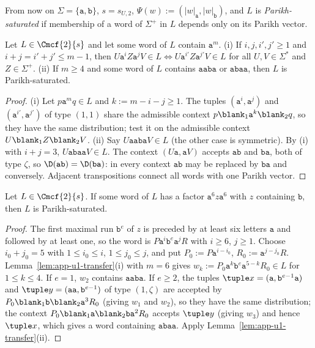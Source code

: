 From now on $\Sigma=\{\mathtt a,\mathtt b\}$, $s=s_{U,2}$, $\Psi(w):=(|w|_{\mathtt a},|w|_{\mathtt b})$,
and $L$ is \emph{Parikh-saturated} if membership of a word of $\Sigma^+$ in $L$
depends only on its Parikh vector.

\begin{lemma}\label{lem:app-u1-transfer}
Let $L\in\Cmcf{2}{s}$ and let some word of $L$ contain $\mathtt a^m$.
\textup{(i)} If $i,j,i',j'\ge1$ and $i+j=i'+j'\le m-1$, then
$U\mathtt a^iZ\mathtt a^jV\in L\iff U\mathtt a^{i'}Z\mathtt a^{j'}V\in L$ for all
$U,V\in\Sigma^*$ and $Z\in\Sigma^+$.
\textup{(ii)} If $m\ge4$ and some word of $L$ contains $\mathtt a\mathtt a\mathtt b\mathtt a$
or $\mathtt a\mathtt b\mathtt a\mathtt a$, then $L$ is Parikh-saturated.
\end{lemma}

\begin{proof}
(i) Let $p\mathtt a^mq\in L$ and $k:=m-i-j\ge1$.  The tuples $(\mathtt a^i,\mathtt a^j)$ and
$(\mathtt a^{i'},\mathtt a^{j'})$ of type $(1,1)$ share the admissible context
$p\blank_1\mathtt a^k\blank_2q$, so they have the same distribution; test it on the
admissible context $U\blank_1Z\blank_2V$.
(ii) Say $U\mathtt a\mathtt a\mathtt b\mathtt a V\in L$ (the other case is symmetric).  By (i)
with $i+j=3$, $U\mathtt a\mathtt b\mathtt a\mathtt aV\in L$.  The context $(U\mathtt a,\mathtt aV)$
accepts $\mathtt{ab}$ and $\mathtt{ba}$, both of type $\zeta$, so
$\D(\mathtt{ab})=\D(\mathtt{ba})$: in every context $\mathtt{ab}$ may be replaced by
$\mathtt{ba}$ and conversely.  Adjacent transpositions connect all words with one
Parikh vector.
\end{proof}

\begin{lemma}\label{lem:app-u1-deep}
Let $L\in\Cmcf{2}{s}$.  If some word of $L$ has a factor $\mathtt a^6z\mathtt a^6$ with $z$
containing $\mathtt b$, then $L$ is Parikh-saturated.
\end{lemma}

\begin{proof}
The first maximal run $\mathtt b^e$ of $z$ is preceded by at least six letters
$\mathtt a$ and followed by at least one, so the word is
$P\mathtt a^i\mathtt b^e\mathtt a^jR$ with $i\ge6$, $j\ge1$.  Choose $i_0+j_0=5$ with
$1\le i_0\le i$, $1\le j_0\le j$, and put $P_0:=P\mathtt a^{i-i_0}$,
$R_0:=\mathtt a^{j-j_0}R$.  Lemma~\ref{lem:app-u1-transfer}(i) with $m=6$ gives
$w_k:=P_0\mathtt a^k\mathtt b^e\mathtt a^{5-k}R_0\in L$ for $1\le k\le4$.  If $e=1$, $w_2$
contains $\mathtt{aaba}$.  If $e\ge2$, the tuples $\tuple x=(\mathtt a,\mathtt b^{e-1}\mathtt a)$
and $\tuple y=(\mathtt a\mathtt a,\mathtt b^{e-1})$ of type $(1,\zeta)$ are accepted by
$P_0\blank_1\mathtt b\blank_2\mathtt a^3R_0$ (giving $w_1$ and $w_2$), so they have the
same distribution; the context $P_0\blank_1\mathtt a\blank_2\mathtt b\mathtt a^2R_0$ accepts
$\tuple y$ (giving $w_3$) and hence $\tuple x$, which gives a word containing
$\mathtt{abaa}$.  Apply Lemma~\ref{lem:app-u1-transfer}(ii).
\end{proof}

